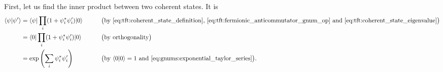 First, let us find the inner product between two coherent states.
It is
\begin{equation}
\begin{aligned}
	\iffalse
	\braket{\psi | \psi'} &= \braket{0 | \prod_i (1 - \destr_i \conj\psi_i) \prod_j (1 - \psi'_j \creat_j) | 0} \\
	                      &= \braket{0 | 0} + \sum_{i,j} \braket{0 | \destr_i \conj\psi_i \psi'_j \creat_j | 0}
	                       = \braket{0 | 0} + \sum_{i,j} \conj\psi_i \psi'_j \braket{0 | \destr_i \creat_j | 0} \\
	                      &= \braket{0 | 0} + \sum_{i  } \conj\psi_i \psi'_i
	                       = 1 + \sum_i \conj\psi_i \psi'_i = \exp \left( \sum_i \conj\psi_i \psi'_i \right) .
	\fi
	\braket{\psi | \psi'} %
	                      &= \braket{\psi | \prod_i (1 + \conj\psi_i \psi'_i) | 0} && \qquad \big( \text{by \eqref{eq:tft:coherent_state_definition}, \eqref{eq:tft:fermionic_anticommutator_gnum_op} and \eqref{eq:tft:coherent_state_eigenvalue}} \big) \\
	                      &= \braket{0    | \prod_i (1 + \conj\psi_i \psi'_i) | 0} && \qquad \big( \text{by orthogonality} \big) \\
	                      &= \exp \left( \sum_i \conj\psi_i \psi'_i \right) && \qquad \big( \text{by $\braket{0|0}=1$ and \eqref{eq:gnums:exponential_taylor_series}} \big) .
\end{aligned}
\label{eq:tft:grassmann_inner_product_discrete}
\end{equation}

